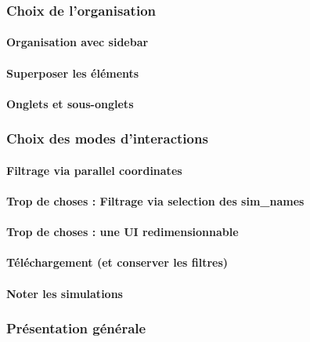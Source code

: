 		\subsubsection{Choix de l'organisation}
			\paragraph*{Organisation avec sidebar}
			\paragraph*{Superposer les éléments}
			\paragraph*{Onglets et sous-onglets}
		\subsubsection{Choix des modes d'interactions}
			\paragraph*{Filtrage via parallel coordinates}
			\paragraph*{Trop de choses : Filtrage via selection des sim\_names}
			\paragraph*{Trop de choses : une UI redimensionnable}
			\paragraph*{Téléchargement (et conserver les filtres)}
			\paragraph*{Noter les simulations}
		\subsubsection{Présentation générale}


\printbibliography[title={Références}]
